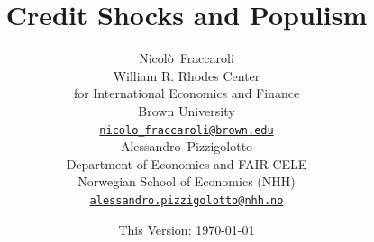 \documentclass[11pt]{article}
\date{This Version: \today}
\title{Credit Shocks and Populism}
\author{
    {Nicolò~Fraccaroli} \\
    William R. Rhodes Center\\
    for International Economics and Finance\\
    Brown University\\
    \href{mailto:nicolo_fraccaroli@brown.edu}{\texttt{nicolo\_fraccaroli@brown.edu}} \\
    \And
    {Alessandro~Pizzigolotto} \\
    Department of Economics and FAIR-CELE\\
    Norwegian School of Economics (NHH)\\
    \href{mailto:alessandro.pizzigolotto@nhh.no}{\texttt{alessandro.pizzigolotto@nhh.no}} \\
}
\begin{document}
\maketitle

\renewcommand{\thefootnote}{\arabic{footnote}}
\setcounter{footnote}{0} 









\end{document}

